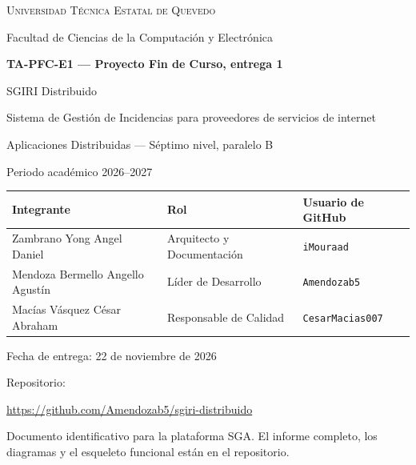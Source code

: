 \documentclass[11pt,a4paper]{article}
\begin{document}
\begin{center}
{\large\scshape Universidad Técnica Estatal de Quevedo\par}
\vspace{0.15cm}
{\normalsize Facultad de Ciencias de la Computación y Electrónica\par}
\vspace{0.6cm}
{\Large\bfseries TA-PFC-E1 — Proyecto Fin de Curso, entrega 1\par}
\vspace{0.4cm}
{\large SGIRI Distribuido\par}
{\normalsize Sistema de Gestión de Incidencias para proveedores de servicios de internet\par}
\vspace{0.2cm}
{\normalsize Aplicaciones Distribuidas — Séptimo nivel, paralelo B\par}
{\normalsize Periodo académico 2026--2027\par}
\end{center}

\vspace{0.8cm}

\begin{center}
\begin{tabular}{@{}lll@{}}
\toprule
\textbf{Integrante} & \textbf{Rol} & \textbf{Usuario de GitHub} \\
\midrule
Zambrano Yong Angel Daniel & Arquitecto y Documentación & \texttt{iMouraad} \\
Mendoza Bermello Angello Agustín & Líder de Desarrollo & \texttt{Amendozab5} \\
Macías Vásquez César Abraham & Responsable de Calidad & \texttt{CesarMacias007} \\
\bottomrule
\end{tabular}
\end{center}

\vspace{0.8cm}

\begin{center}
{\normalsize Fecha de entrega: 22 de noviembre de 2026\par}
\vspace{0.6cm}
{\normalsize Repositorio:\par}
\vspace{0.25cm}
{\small \mbox{\url{https://github.com/Amendozab5/sgiri-distribuido}}\par}
\end{center}

\vfill

\begin{center}
{\footnotesize Documento identificativo para la plataforma SGA. El informe completo, los diagramas y
el esqueleto funcional están en el repositorio.}
\end{center}
\end{document}
